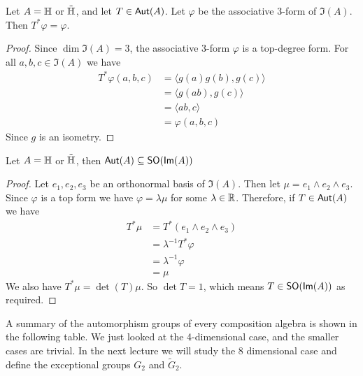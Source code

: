 \begin{lemma}
Let $A = \operatorname{\mathbb{H}}$ or $\tilde{\operatorname{\mathbb{H}}}$, and let $T\in \operatorname{\textsf{Aut}}(A)$. Let $\varphi$ be the associative 3-form of $\Im(A)$. Then $T^* \varphi = \varphi$.
\end{lemma}
\begin{proof}
    Since $\dim \Im(A) = 3$, the associative 3-form $\varphi$ is a top-degree form. For all $a,b,c\in \Im(A)$ we have
    \begin{align*}
        T^*\varphi(a,b,c) &= \langle g(a)g(b),g(c)\rangle\\
        &= \langle g(ab),g(c)\rangle\\
        &= \langle ab,c\rangle\\
        &= \varphi(a,b,c)
    \end{align*}
    Since $g$ is an isometry.
\end{proof}
\begin{lemma}
Let $A = \operatorname{\mathbb{H}}$ or $\tilde{\operatorname{\mathbb{H}}}$, then $\operatorname{\textsf{Aut}}(A) \subseteq \operatorname{\textsf{SO}}(\textsf{Im}(A))$
\end{lemma}
\begin{proof}
    Let $e_1,e_2,e_3$ be an orthonormal basis of $\Im(A)$. Then let $\mu = e_1\wedge e_2\wedge e_3$. Since $\varphi$ is a top form we have $\varphi = \lambda \mu$ for some $\lambda \in \operatorname{\mathbb{R}}$. Therefore, if $T \in \operatorname{\textsf{Aut}}(A)$ we have
    \begin{align*}
        T^*\mu &= T^*( e_1\wedge e_2\wedge e_3)\\&= \lambda^{-1}T^*\varphi\\
        &= \lambda^{-1}\varphi\\
        &= \mu
    \end{align*}
    We also have $T^*\mu = \det(T) \mu$. So $\det T = 1$, which means $T \in \operatorname{\textsf{SO}}(\textsf{Im}(A))$ as required.
\end{proof}

A summary of the automorphism groups of every composition algebra is shown in the following table. We just looked at the 4-dimensional case, and the smaller cases are trivial. In the next lecture we will study the 8 dimensional case and define the exceptional groups $G_2$ and $\tilde{G}_2$.

